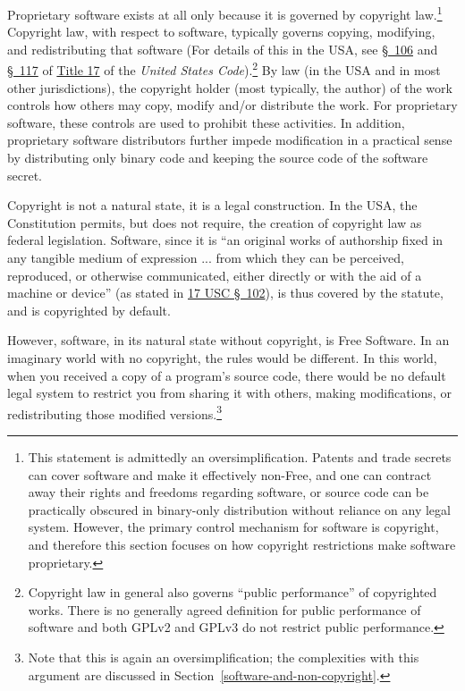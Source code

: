 Proprietary software exists at all only because it is governed by copyright
law.\footnote{This statement is admittedly an oversimplification. Patents and
  trade secrets can cover software and make it effectively non-Free, and one
  can contract away their rights and freedoms regarding software, or source
  code can be practically obscured in binary-only distribution without
  reliance on any legal system.  However, the primary control mechanism for
  software is copyright, and therefore this section focuses on how copyright
  restrictions make software proprietary.} Copyright law, with respect to
software, typically governs copying, modifying, and redistributing that
software (For details of this in the USA, see
\href{http://www.copyright.gov/title17/92chap1.html#106}{\S~106} and
\href{http://www.copyright.gov/title17/92chap1.html#117}{\S~117} of
\href{http://www.law.cornell.edu/uscode/text/17}{Title 17} of the
\textit{United States Code}).\footnote{Copyright law in general also governs
  ``public performance'' of copyrighted works. There is no generally agreed
  definition for public performance of software and both GPLv2 and GPLv3 do
  not restrict public performance.} By law (in the USA and in most other
jurisdictions), the copyright holder (most typically, the author) of the work controls
how others may copy, modify and/or distribute the work. For proprietary
software, these controls are used to prohibit these activities. In addition,
proprietary software distributors further impede modification in a practical
sense by distributing only binary code and keeping the source code of the
software secret.

Copyright is not a natural state, it is a legal construction. In the USA, the
Constitution permits, but does not require, the creation of copyright law as
federal legislation.  Software, since it is ``an original works of authorship
fixed in any tangible medium of expression ...  from which they can be
perceived, reproduced, or otherwise communicated, either directly or with the
aid of a machine or device'' (as stated in
\href{http://www.law.cornell.edu/uscode/text/17/102}{17 USC \S~102}), is thus
covered by the statute, and is copyrighted by default.

However, software, in its natural state without copyright, is Free
Software. In an imaginary world with no copyright, the rules would be
different. In this world, when you received a copy of a program's source
code, there would be no default legal system to restrict you from sharing it
with others, making modifications, or redistributing those modified
versions.\footnote{Note that this is again an oversimplification; the
  complexities with this argument are discussed in
  Section~\ref{software-and-non-copyright}.}

